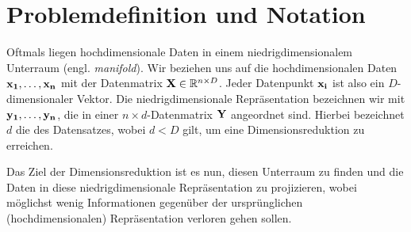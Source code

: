 \chapter{Problemdefinition und Notation}
\label{ch:ProblemdefinitionUndNotation}

Oftmals liegen hochdimensionale Daten in einem niedrigdimensionalem Unterraum (engl. \textit{manifold}). Wir beziehen uns auf die hochdimensionalen Daten $\mathbf{x_1},\ldots,\mathbf{x_n}$ mit der Datenmatrix $\mathbf{X} \in \mathbb{R}^{n \times D}$. Jeder Datenpunkt $\mathbf{x_i}$ ist also ein $D$-dimensionaler Vektor. Die niedrigdimensionale Repräsentation bezeichnen wir mit $\mathbf{y_1},\ldots,\mathbf{y_n}$, die in einer $n \times d$-Datenmatrix $\mathbf{Y}$ angeordnet sind. Hierbei bezeichnet $d$ die
 des Datensatzes, wobei $d < D$ gilt, um eine Dimensionsreduktion zu erreichen.


Das Ziel der Dimensionsreduktion ist es nun, diesen Unterraum zu finden und die Daten in diese niedrigdimensionale Repräsentation zu projizieren, wobei möglichst wenig Informationen gegenüber der ursprünglichen (hochdimensionalen) Repräsentation verloren gehen sollen.